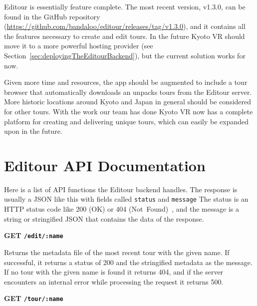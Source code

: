 \documentclass[a4paper, 10pt, american, titlepage]{article}
\newenvironment{indented}[1]%
{\begin{list}{}%
	{\setlength{\leftmargin}{#1}}%
	\item[]%
}
{\end{list}}
\begin{document}
Editour is essentially feature complete. The most recent version, v1.3.0, can be
found in the GitHub repository
(\url{https://github.com/bandaloo/editour/releases/tag/v1.3.0}), and it contains
all the features necessary to create and edit tours. In the future Kyoto VR
should move it to a more powerful hosting provider (see
Section~\ref{sec:deployingTheEditourBackend}), but the current solution works
for now.

Given more time and resources, the app should be augmented to include a tour
browser that automatically downloads an unpacks tours from the Editour server.
More historic locations around Kyoto and Japan in general should be considered
for other tours. With the work our team has done Kyoto VR now has a complete
platform for creating and delivering unique tours, which can easily be expanded
upon in the future.

\clearpage %

\begin{singlespace}
	\printbibliography
\end{singlespace}

\clearpage

\appendices
\section{Editour API Documentation}
\label{sec:editourAPIDocumentation}

Here is a list of API functions the Editour backend handles. The response is
usually a JSON like this with fields called \texttt{status} and \texttt{message}
The status is an HTTP status code like 200 (OK) or 404
(Not~Found)~\autocite{rfc7231}, and the message is a string or stringified JSON
that contains the data of the response.

\noindent\textbf{GET \texttt{/edit/:name}}

\begin{indented}{1cm}
	Returns the metadata file of the most recent tour with the given name. If
	successful, it returns a status of 200 and the stringified metadata as the
	message. If no tour with the given name is found it returns 404, and if the
	server encounters an internal error while processing the request it returns
	500.
\end{indented}

\noindent\textbf{GET \texttt{/tour/:name}}
\end{document}
